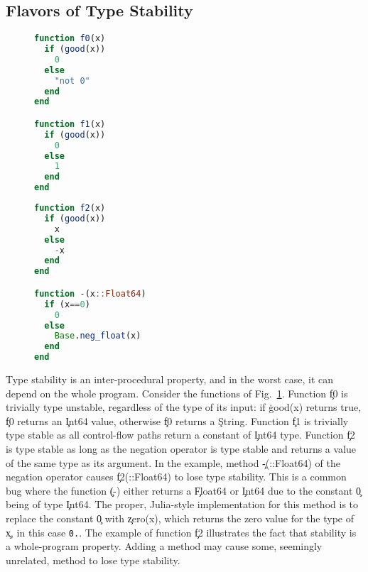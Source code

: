 \subsection{Flavors of Type Stability}

\begin{figure}[t]\footnotesize
\begin{minipage}{5cm}\begin{lstlisting}[basicstyle=\footnotesize\ttfamily,language=julia]
function f0(x)
  if (good(x))
    0
  else
    "not 0"
  end
end

function f1(x)
  if (good(x))
    0
  else
    1
  end
end
\end{lstlisting}\end{minipage}
\hspace{1cm}
\begin{minipage}{5cm}\begin{lstlisting}[basicstyle=\footnotesize\ttfamily,language=julia]
function f2(x)
  if (good(x))
    x
  else
    -x
  end
end

function -(x::Float64)
  if (x==0)
    0
  else
    Base.neg_float(x)
  end
end
\end{lstlisting}\end{minipage}
\caption{}\label{fla}
\end{figure}

Type stability is an inter-procedural property, and in the worst case, it can depend
on the whole program. Consider the functions of Fig.~\ref{fla}. Function \c{f0}
is trivially type unstable, regardless of the type of its input: if \c{good(x)}
returns true, \c{f0} returns an \c{Int64} value, otherwise \c{f0} returns a
\c{String}. Function \c{f1} is trivially type stable as all control-flow paths
return a constant of \c{Int64} type. Function \c{f2} is type stable as
long as the negation operator is type stable and returns a value of the same type
as its argument. In the example, method \c{-(::Float64)} of the negation operator causes
\c{f2(::Float64)} to lose type stability. This is a common bug where the function
\c{(-)} either returns a \c{Float64} or \c{Int64} due to the constant \c{0} being
of type \c{Int64}.  The proper, Julia-style implementation for this method is
to replace the constant \c{0} with \c{zero(x)}, which returns the zero value
for the type of \c{x}, in this case \texttt{\small0\!.}.
The example of function \c{f2} illustrates the fact that stability is a
whole-program property. Adding a method may cause some, seemingly unrelated,
method to lose type stability.

